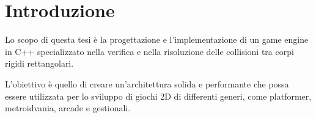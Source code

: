 \chapter*{Introduzione}
Lo scopo di questa tesi è la progettazione e l'implementazione di un game engine in C++ specializzato nella verifica e nella risoluzione delle collisioni tra corpi rigidi rettangolari. 

L'obiettivo è quello di creare un'architettura solida e performante che possa essere utilizzata per lo sviluppo di giochi 2D di differenti generi, come platformer, metroidvania, arcade e gestionali.